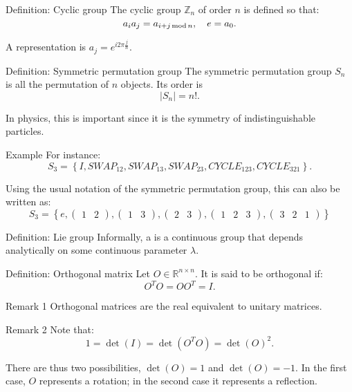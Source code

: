 \documentclass[a4paper]{article}
\begin{document}
\begin{parag}{Definition: Cyclic group}
    The cyclic group $\mathbb{Z}_n$ of order $n$ is defined so that: 
    \[a_{i} a_j = a_{i + j \operatorname{mod} n}, \quad e = a_0.\]

    A representation is $a_j = e^{i 2\pi \frac{j}{n}}$.
\end{parag}

\begin{parag}{Definition: Symmetric permutation group}
    The symmetric permutation group $S_n$ is all the permutation of $n$ objects. Its order is 
    \[\left|S_n\right| = n!.\]

    In physics, this is important since it is the symmetry of indistinguishable particles.

    \begin{subparag}{Example}
        For instance: 
        \[S_3 = \left\{I, SWAP_{12}, SWAP_{13}, SWAP_{23}, CYCLE_{123}, CYCLE_{321}\right\}.\]

        Using the usual notation of the symmetric permutation group, this can also be written as: 
        \[S_3 = \left\{e, \begin{pmatrix} 1 & 2 \end{pmatrix}, \begin{pmatrix} 1 & 3 \end{pmatrix}, \begin{pmatrix} 2 & 3\end{pmatrix}, \begin{pmatrix} 1 & 2 & 3 \end{pmatrix}, \begin{pmatrix} 3 & 2 & 1 \end{pmatrix} \right\}\]
        
    \end{subparag}
\end{parag}

\begin{parag}{Definition: Lie group}
    Informally, a  is a continuous group that depends analytically on some continuous parameter $\lambda$.
\end{parag}

\begin{parag}{Definition: Orthogonal matrix}
    Let $O \in \mathbb{R}^{n \times n}$. It is said to be orthogonal if: 
    \[O^T O = O O^T = I.\]
    
    \begin{subparag}{Remark 1}
        Orthogonal matrices are the real equivalent to unitary matrices.
    \end{subparag}

    \begin{subparag}{Remark 2}
        Note that: 
        \[1 = \det\left(I\right) = \det\left(O^T O\right) = \det\left(O\right)^2.\]
        
        There are thus two possibilities, $\det\left(O\right) = 1$ and $\det\left(O\right) = -1$. In the first case, $O$ represents a rotation; in the second case it represents a reflection.
    \end{subparag}
\end{parag}
\end{document}
